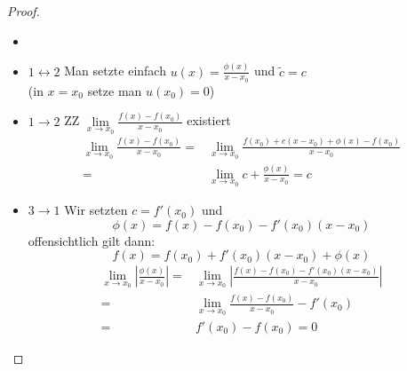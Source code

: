 \begin{proof}{
	\begin{itemize}
		\item[ ]
		\item[]$1 \leftrightarrow 2$ Man setzte einfach $u\left(x\right) = \frac{\phi\left(x\right)}{x-x_0}$ und $\tilde{c} = c$ \\
		(in $x = x_0$ setze man $u\left(x_0\right) = 0$)
		\item[]$1 \rightarrow 2$ ZZ $\lim\limits_{x \rightarrow x_0}{\frac{f\left(x\right)-f\left(x_0\right)}{x-x_0}}$ existiert
		\begin{align*}
			\lim\limits_{x\rightarrow x_0}
			{\frac{f\left(x\right) - f\left(x_0\right)}{x-x_0}} 
			= & \lim\limits_{x \rightarrow x_0}
			{\frac{f\left(x_0\right) + c\left(x-x_0\right)+\phi
			\left(x\right)-f\left(x_0\right)}{x-x_0}} \\
			 = & \lim\limits_{x\rightarrow x_0}
			{c + \frac{\phi \left(x\right)}{x-x_0}} = c
		\end{align*}
		\item[]$3\rightarrow 1$ Wir setzten $ c = f'\left(x_0\right)$ und 
		\begin{equation*}
			\phi\left(x\right) = f\left(x\right) - f\left(x_0\right) - f'\left(x_0\right)\left(x-x_0\right)
		\end{equation*}
		offensichtlich gilt dann:
		\begin{equation*}
			f\left(x\right) = f\left(x_0\right) 
			+ f'\left(x_0\right)\left(x-x_0\right) + \phi\left(x\right)
		\end{equation*}
		\begin{align*}
			\lim\limits_{x\rightarrow x_0}
			{\left\vert \frac{\phi\left(x\right)}{x-x_0}\right\vert} 
			= & \lim\limits_{x \rightarrow x_0}
			{\left\vert \frac{f\left(x\right)-f\left(x_0\right)-
			f'\left(x_0\right)\left(x-x_0\right)}{x-x_0}\right\vert} \\
			= & \lim\limits_{x\rightarrow x_0}{\frac{f\left(x\right)-
			f\left(x_0\right)}{x-x_0} - f'\left(x_0\right)} \\
			= & f'\left(x_0\right) - f\left(x_0\right) 
			=0
		\end{align*}
	\end{itemize}
	\qedhere
}\end{proof}
